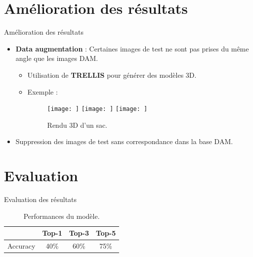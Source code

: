 \documentclass{beamer}
\begin{document}
\section{Amélioration des résultats}
\begin{frame}{Amélioration des résultats}
\begin{itemize}
    \item \textbf{Data augmentation} : Certaines images de test ne sont pas prises du même angle que les images DAM.
    \begin{itemize}
        \item Utilisation de \textbf{TRELLIS} pour générer des modèles 3D.
        \item Exemple :
        \begin{figure}
            \texttt{[image: ]}
            \texttt{[image: ]}
            \texttt{[image: ]}
            \caption{Rendu 3D d'un sac.}
        \end{figure}
    \end{itemize}
    \item Suppression des images de test sans correspondance dans la base DAM.
\end{itemize}
\end{frame}

\section{Evaluation}
\begin{frame}{Evaluation des résultats}
\begin{table}[]
    \centering
    \begin{tabular}{|c|c|c|c|}
    \hline
    \textbf{} & \textbf{Top-1} & \textbf{Top-3} & \textbf{Top-5} \\
    \hline
    Accuracy & 40\% & 60\% & 75\% \\
    \hline
    \end{tabular}
    \caption{Performances du modèle.}
\end{table}
\end{frame}
\end{document}
